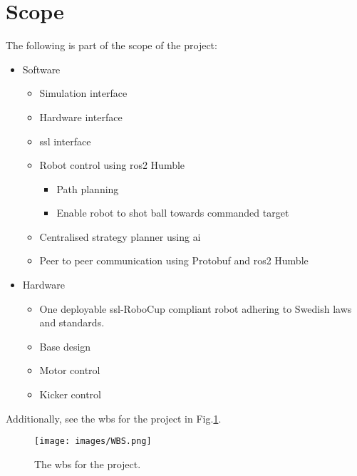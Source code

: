 \section{Scope}
\label{section:scope}

The following is part of the scope of the project:
\begin{itemize}
    \item Software
    \begin{itemize}
        \item Simulation interface
        \item Hardware interface
        \item \ac{ssl} interface
        \item Robot control using \ac{ros2} Humble
        \begin{itemize}
            \item Path planning
            \item Enable robot to shot ball towards commanded target
        \end{itemize}
        \item Centralised strategy planner using \ac{ai}
        \item Peer to peer communication using Protobuf and \ac{ros2} Humble
    \end{itemize}
    \item Hardware
    \begin{itemize}
        \item One deployable \ac{ssl}-RoboCup compliant robot adhering to Swedish laws and standards.
        \item Base design
        \item Motor control
        \item Kicker control
    \end{itemize}
\end{itemize}   
Additionally, see the \ac{wbs} for the project in Fig.\:\ref{fig:wbs}.

\begin{figure}
    \centering
    \texttt{[image: images/WBS.png]}
    \caption{The \acl{wbs} for the project.}
    \label{fig:wbs}
\end{figure}



